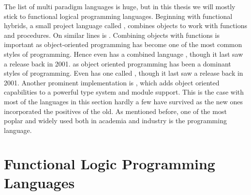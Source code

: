 \documentclass[thesis-solanki.tex]{subfiles}
\begin{document}
The list of multi paradigm languages is huge, but in this thesis we will mostly stick to functional logical
programming languages. Beginning with functional hybrids, a small project language called 
\cite{website:virgil}, combines objects to work with functions and procedures.
On similar lines is  \cite{website:closwiki}.
Combining objects with functions is important as object-oriented programming has become one of the most common styles of programming. Hence 
even  has a combined language , though it last saw a 
release back in 2001.
as object oriented programming has been a dominant styles of programming. Even  has one called 
\cite{website:ohaskell},
though it last saw a release back in 2001.
Another prominent implementation is 
\cite{website:ocamlwiki,website:ocamllang},
which adds object oriented capabilities to a powerful type system and module support.
This is the case with most of the languages in this section hardly a few have survived as the new ones incorporated
the positives of the old.
As mentioned before, one of the most poplar \cite{website:langpop} and widely used both in academia and industry is
the  \cite{website:scala} programming language.


\section{Functional Logic Programming Languages}
\end{document}

